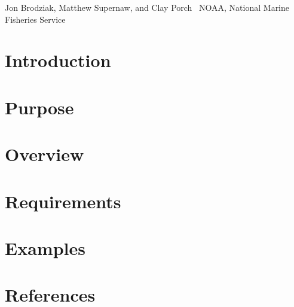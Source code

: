 Jon Brodziak, Matthew Supernaw, and Clay Porch~\newline
 N\+O\+A\+A, National Marine Fisheries Service~\newline
\hypertarget{index_Introduction}{}\section{Introduction}\label{index_Introduction}
\hypertarget{index_Purpose}{}\section{Purpose}\label{index_Purpose}
\hypertarget{index_Overview}{}\section{Overview}\label{index_Overview}
\hypertarget{index_Requirements}{}\section{Requirements}\label{index_Requirements}
\hypertarget{index_Examples}{}\section{Examples}\label{index_Examples}
\hypertarget{MAS.hpp_References}{}\section{References}\label{MAS.hpp_References}
